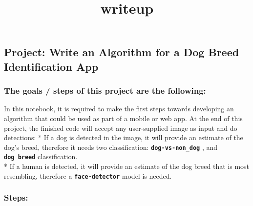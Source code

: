 \documentclass[11pt]{article}
\title{writeup}
\begin{document}
    
    
    \maketitle
    
    

    
    \subsection{Project: Write an Algorithm for a Dog Breed Identification
App}\label{project-write-an-algorithm-for-a-dog-breed-identification-app}

\subsubsection{The goals / steps of this project are the
following:}\label{the-goals-steps-of-this-project-are-the-following}

In this notebook, it is required to make the first steps towards
developing an algorithm that could be used as part of a mobile or web
app. At the end of this project, the finished code will accept any
user-supplied image as input and do detections: * If a dog is detected
in the image, it will provide an estimate of the dog's breed, therefore
it needs two classification: \textbf{\texttt{dog-vs-non\_dog}} , and
\textbf{\texttt{dog\ breed}} classification.\\
* If a human is detected, it will provide an estimate of the dog breed
that is most resembling, therefore a \textbf{\texttt{face-detector}}
model is needed.

\subsubsection{\texorpdfstring{\textbf{Steps:}}{Steps:}}\label{steps}
\end{document}
